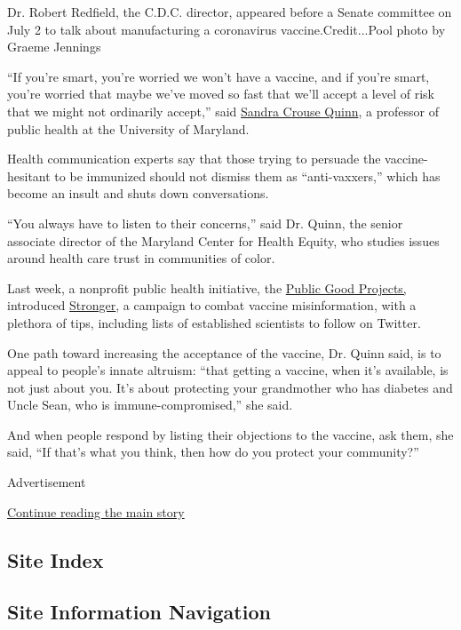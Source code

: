 Dr. Robert Redfield, the C.D.C. director, appeared before a Senate
committee on July 2 to talk about manufacturing a coronavirus
vaccine.Credit...Pool photo by Graeme Jennings

``If you're smart, you're worried we won't have a vaccine, and if you're
smart, you're worried that maybe we've moved so fast that we'll accept a
level of risk that we might not ordinarily accept,'' said
\href{https://sph.umd.edu/department/fmsc/bio/18882}{Sandra Crouse
Quinn}, a professor of public health at the University of Maryland.

Health communication experts say that those trying to persuade the
vaccine-hesitant to be immunized should not dismiss them as
``anti-vaxxers,'' which has become an insult and shuts down
conversations.

``You always have to listen to their concerns,'' said Dr. Quinn, the
senior associate director of the Maryland Center for Health Equity, who
studies issues around health care trust in communities of color.

Last week, a nonprofit public health initiative, the
\href{https://publicgoodprojects.org/}{Public Good Projects,} introduced
\href{https://stronger.org/}{Stronger}, a campaign to combat vaccine
misinformation, with a plethora of tips, including lists of established
scientists to follow on Twitter.

One path toward increasing the acceptance of the vaccine, Dr. Quinn
said, is to appeal to people's innate altruism: ``that getting a
vaccine, when it's available, is not just about you. It's about
protecting your grandmother who has diabetes and Uncle Sean, who is
immune-compromised,'' she said.

And when people respond by listing their objections to the vaccine, ask
them, she said, ``If that's what you think, then how do you protect your
community?''

Advertisement

\protect\hyperlink{after-bottom}{Continue reading the main story}

\hypertarget{site-index}{%
\subsection{Site Index}\label{site-index}}

\hypertarget{site-information-navigation}{%
\subsection{Site Information
Navigation}\label{site-information-navigation}}

